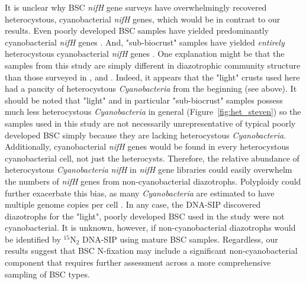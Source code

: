 {It is unclear why BSC \textit{nifH} gene surveys have overwhelmingly
recovered heterocystous, cyanobacterial \textit{nifH} genes, which would be
in contrast to our results. Even poorly developed BSC samples have yielded
predominantly cyanobacterial \textit{nifH} genes \citep{14766579}. And,
"sub-biocrust" samples have yielded \textit{entirely} heterocystous
cyanobacterial \textit{nifH} genes \citep{Yeager_2012}. One explanation might
be that the samples from this study are simply different in diazotrophic
community structure than those surveyed in \citet{Yeager}, \citet{14766579}
and \citet{Yeager_2012}.  Indeed, it appears that the "light" crusts used
here had a paucity of heterocystous \textit{Cyanobacteria} from the beginning
(see above). It should be noted that "light" and in particular "sub-biocrust"
samples possess much less heterocystous \textit{Cyanobacteria} in general
(Figure~\ref{fig:het_steven}) so the samples used in this study are not
necessarily unrepresentative of typical poorly developed BSC simply because
they are lacking heterocystous \textit{Cyanobacteria}. Additionally, cyanobacterial
\textit{nifH} genes would be found in every heterocystous cyanobacterial
cell, not just the heterocysts.  Therefore, the relative abundance of
heterocystous \textit{Cyanobacteria} \textit{nifH} in \textit{nifH} gene
libraries could easily overwhelm the numbers of \textit{nifH} genes from
non-cyanobacterial diazotrophs. Polyploidy could further exacerbate this bias,
as many \textit{Cyanobacteria} are estimated to have multiple genome copies
per cell \citep{Griese_2011}. In any case, the DNA-SIP discovered diazotrophs
for the "light", poorly developed BSC used in the study were not
cyanobacterial. It is unknown, however, if non-cyanobacterial diazotrophs
would be identified by $^{15}$N$_{2}$ DNA-SIP using mature BSC samples.
Regardless, our results suggest that BSC N-fixation may include a significant
non-cyanobacterial component that requires further assessment across a more
comprehensive sampling of BSC types.

}
